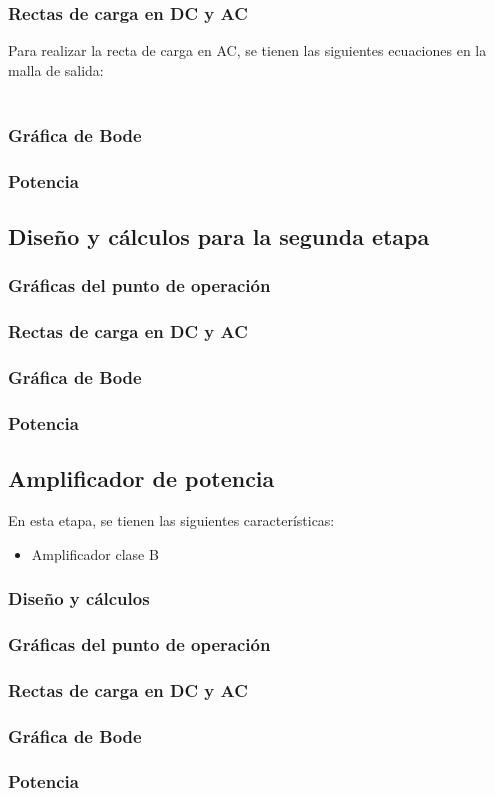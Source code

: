 \documentclass[a4paper, 12pt]{article}
\begin{document}
\subsubsection{Rectas de carga en DC y AC}
Para realizar la recta de carga en AC, se tienen las siguientes ecuaciones en la malla de salida:

\begin{align*}
\end{align*}
\subsubsection{Gráfica de Bode}
\subsubsection{Potencia}

\subsection{Diseño y cálculos para la segunda etapa}
\subsubsection{Gráficas del punto de operación}
\subsubsection{Rectas de carga en DC y AC}
\subsubsection{Gráfica de Bode}
\subsubsection{Potencia}

\newpage
\subsection{Amplificador de potencia}
En esta etapa, se tienen las siguientes características:
\begin{itemize}
    \item Amplificador clase B
\end{itemize}

\subsubsection{Diseño y cálculos}
\subsubsection{Gráficas del punto de operación}
\subsubsection{Rectas de carga en DC y AC}
\subsubsection{Gráfica de Bode}
\subsubsection{Potencia}
\end{document}
